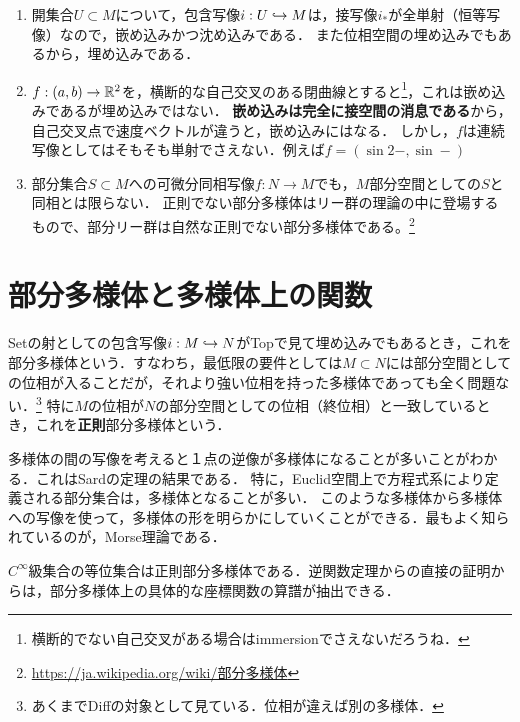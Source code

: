 \documentclass[uplatex,dvipdfmx]{jsreport}
\begin{document}
\begin{example}\mbox{}
    \begin{enumerate}
        \item 開集合$U\subset M$について，包含写像$i:U\hookrightarrow M$は，接写像$i_*$が全単射（恒等写像）なので，嵌め込みかつ沈め込みである．
        また位相空間の埋め込みでもあるから，埋め込みである．
        \item $f:(a,b)\to\mathbb{R}^2$を，横断的な自己交叉のある閉曲線とすると\footnote{横断的でない自己交叉がある場合はimmersionでさえないだろうね．}，これは嵌め込みであるが埋め込みではない．
        \textbf{嵌め込みは完全に接空間の消息である}から，自己交叉点で速度ベクトルが違うと，嵌め込みにはなる．
        しかし，$f$は連続写像としてはそもそも単射でさえない．例えば$f=(\sin2-,\sin-)$
        \item 部分集合$S\subset M$への可微分同相写像$f:N\to M$でも，$M$部分空間としての$S$と同相とは限らない．
        正則でない部分多様体はリー群の理論の中に登場するもので、部分リー群は自然な正則でない部分多様体である。\footnote{\url{https://ja.wikipedia.org/wiki/部分多様体}}
    \end{enumerate}
\end{example}

\section{部分多様体と多様体上の関数}

\begin{tcolorbox}[colframe=ForestGreen, colback=ForestGreen!10!white,breakable,colbacktitle=ForestGreen!40!white,coltitle=black,fonttitle=\bfseries\sffamily,
title=]
    Setの射としての包含写像$i:M\hookrightarrow N$がTopで見て埋め込みでもあるとき，これを部分多様体という．すなわち，最低限の要件としては$M\subset N$には部分空間としての位相が入ることだが，それより強い位相を持った多様体であっても全く問題ない．\footnote{あくまでDiffの対象として見ている．位相が違えば別の多様体．}
    特に$M$の位相が$N$の部分空間としての位相（終位相）と一致しているとき，これを\textbf{正則}部分多様体という．

    多様体の間の写像を考えると１点の逆像が多様体になることが多いことがわかる．これはSardの定理の結果である．
    特に，Euclid空間上で方程式系により定義される部分集合は，多様体となることが多い．
    このような多様体から多様体への写像を使って，多様体の形を明らかにしていくことができる．最もよく知られているのが，Morse理論である．

    $C^\infty$級集合の等位集合は正則部分多様体である．逆関数定理からの直接の証明からは，部分多様体上の具体的な座標関数の算譜が抽出できる．
\end{tcolorbox}
\end{document}
